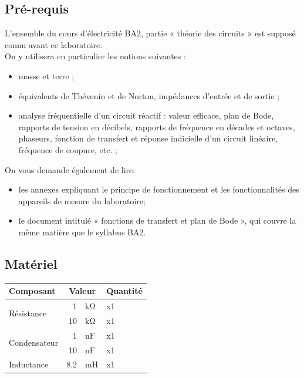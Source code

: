 \documentclass{../template/labo}
\begin{document}
\subsection{Pré-requis}
L'ensemble du cours d'électricité BA2, partie « théorie des circuits » est supposé connu avant ce laboratoire.\\
On y utilisera en particulier les notions suivantes :
\begin{itemize}
\item masse et terre ; %
\item équivalents de Thévenin et de Norton, impédances d'entrée et de sortie ; %
\item analyse fréquentielle d'un circuit réactif : valeur efficace, plan de Bode, rapports de tension en
décibels, rapports de fréquence en décades et octaves, phaseurs, fonction de transfert et réponse indicielle d'un
circuit linéaire, fréquence de coupure, etc. ; %
\end{itemize}
On vous demande également de lire:
\begin{itemize}
\item les annexes expliquant le principe de fonctionnement et les fonctionnalités des appareils de mesure du laboratoire;
\item le document intitulé « fonctions de transfert et plan de Bode », qui couvre la même matière que le syllabus BA2.
\end{itemize}

\subsection{Matériel}

\begin{center}
\begin{tabular}{p{}rlp{}}
	Composant & \multicolumn{2}{c}{Valeur} & Quantité \\\toprule
	\multirow{2}{*}{Résistance} & 1 & $\si{\kohm}$ & x1 \\
								& 10 & $\si{\kohm}$ & x1 \\\midrule
	\multirow{2}{*}{Condensateur} 	& 1 & $\si{\nano\farad}$ & x1 \\
									& 10 & $\si{\nano\farad}$ & x1 \\\midrule
	Inductance & 8.2 & \si{\milli\henry} & x1 \\\bottomrule
\end{tabular}
\end{center}
\end{document}
